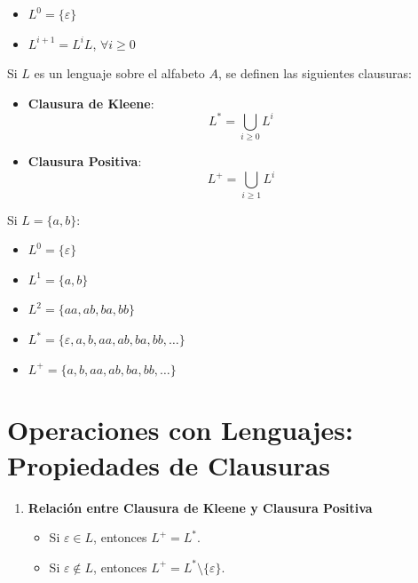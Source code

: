 \documentclass[12pt]{report} %
\providecommand{\tightlist}{%
  \setlength{\itemsep}{0pt}\setlength{\parskip}{0pt}}
\begin{document}
\begin{itemize}
\tightlist
\item
  \(L^0 = \{\varepsilon\}\)\\
\item
  \(L^{i+1} = L^iL\), \(\forall i \geq 0\)
\end{itemize}

Si \(L\) es un lenguaje sobre el alfabeto \(A\), se definen las
siguientes clausuras:

\begin{itemize}
\item
  \textbf{Clausura de Kleene}:\\
  \[
    L^* = \bigcup_{i \geq 0} L^i
    \]
\item
  \textbf{Clausura Positiva}:\\
  \[
    L^+ = \bigcup_{i \geq 1} L^i
    \]
\end{itemize}

\begin{ejemplo}
Si $L = \{a, b\}$:  
\begin{itemize}
    \item $L^0 = \{\varepsilon\}$  
    \item $L^1 = \{a, b\}$  
    \item $L^2 = \{aa, ab, ba, bb\}$  
    \item $L^* = \{\varepsilon, a, b, aa, ab, ba, bb, \ldots\}$  
    \item $L^+ = \{a, b, aa, ab, ba, bb, \ldots\}$  
\end{itemize}
\end{ejemplo}

\hypertarget{operaciones-con-lenguajes-propiedades-de-clausuras}{%
\section{Operaciones con Lenguajes: Propiedades de
Clausuras}\label{operaciones-con-lenguajes-propiedades-de-clausuras}}

\begin{enumerate}
\def\labelenumi{\arabic{enumi}.}
\tightlist
\item
  \textbf{Relación entre Clausura de Kleene y Clausura Positiva}

  \begin{itemize}
  \tightlist
  \item
    Si \(\varepsilon \in L\), entonces \(L^+ = L^*\).\\
  \item
    Si \(\varepsilon \notin L\), entonces
    \(L^+ = L^* \setminus \{\varepsilon\}\).
  \end{itemize}
\end{enumerate}
\end{document}
